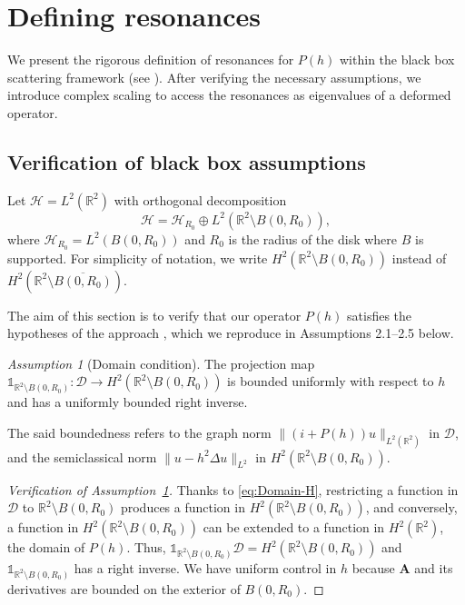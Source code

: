 \documentclass[11pt]{amsart}
\theoremstyle{remark}
\newtheorem{assumption}[theorem]{Assumption}
\newcommand{\bA}{\mathbf{A}}
\newcommand{\R}{\mathbb{R}}
\numberwithin{equation}{section}
\begin{document}
\section{Defining  resonances}\label{sec:def res}

We  present the rigorous definition of resonances for $P(h)$ within the black box scattering framework (see \cite{S, TZ}). After verifying the necessary assumptions, we introduce complex scaling to access the resonances as eigenvalues of a deformed operator.

\subsection{Verification of black box assumptions}\label{sec:blackbox}

Let $\mathcal{H} = L^2(\R^2)$ with orthogonal decomposition
\[
\mathcal{H} = \mathcal{H}_{R_0} \oplus L^2(\R^2 \setminus B(0,R_0)),
\]
where $\mathcal{H}_{R_0} = L^2(B(0,R_0))$ and  $R_0$ is the radius of the disk where $B$ is supported.  For simplicity of notation, we  write $ H^2(\R^2 \setminus B(0,R_0))$ instead of $ H^2(\R^2 \setminus \overline{B(0,R_0)})$.\medskip  

The aim of this section is to verify that our operator \(P(h)\) satisfies the hypotheses of the approach \cite[Section 2, p. 263]{TZ}, which we reproduce in Assumptions 2.1–2.5 below.


\begin{assumption}[Domain condition]\label{ass:D-C}
The projection map $\mathbb{1}_{\R^2\setminus B(0,R_0)}:\mathcal D\to H^2(\mathbb R^2\setminus B(0,R_0))$ is   bounded uniformly with respect to $h$ and has  a uniformly bounded right inverse.
\end{assumption}

The said boundedness refers to the graph norm  $\|(i+P(h))u\|_{L^2(\R^2)}$ in $\mathcal D$, and the semiclassical norm $\|u-h^2\Delta u\|_{L^2}$ in $H^2(\R^2\setminus B(0,R_0))$.

\begin{proof}[Verification of Assumption~\ref{ass:D-C}]
Thanks to \eqref{eq:Domain-H}, restricting a function in $\mathcal D$  to $\R^2\setminus B(0,R_0)$ produces a function in $H^2(\R^2 \setminus B(0,R_0))$, and conversely, a function in $H^2(\R^2 \setminus B(0,R_0))$ can be extended to a function in $H^2(\R^2)$, the domain of $P(h)$. Thus, $\mathbb{1}_{\R^2 \setminus B(0,R_0)} \mathcal{D} = H^2(\R^2 \setminus B(0,R_0))$ and $\mathbb{1}_{\R^2\setminus B(0,R_0)}$
has a right inverse. We have uniform control in $h$  because $\bA$ and its derivatives are bounded on the exterior of $B(0,R_0)$. 
\end{proof}
\end{document}
